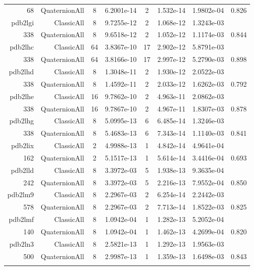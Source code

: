 \begin{xltabular}{\textwidth}{r|rcS[table-format=1.4e+2]cS[table-format=1.3e+2]S[table-format=1.4e+2]S[table-format=-1.3]}
68 & QuaternionAll & 8 & 6.2001e-14 & 2 & 1.532e-14 & 1.9802e-04 & 0.826\\  \addlinespace
pdb2lgi & ClassicAll & 8 & 9.7255e-12 & 2 & 1.068e-12 & 1.3243e-03 & \\
338 & QuaternionAll & 8 & 9.6518e-12 & 2 & 1.052e-12 & 1.1174e-03 & 0.844\\  \addlinespace
pdb2lhc & ClassicAll & 64 & 3.8367e-10 & 17 & 2.902e-12 & 5.8791e-03 & \\
338 & QuaternionAll & 64 & 3.8166e-10 & 17 & 2.997e-12 & 5.2790e-03 & 0.898\\  \addlinespace
pdb2lhd & ClassicAll & 8 & 1.3048e-11 & 2 & 1.930e-12 & 2.0522e-03 & \\
338 & QuaternionAll & 8 & 1.4592e-11 & 2 & 2.033e-12 & 1.6262e-03 & 0.792\\  \addlinespace
pdb2lhe & ClassicAll & 16 & 9.7862e-10 & 2 & 4.963e-11 & 2.0862e-03 & \\
338 & QuaternionAll & 16 & 9.7867e-10 & 2 & 4.967e-11 & 1.8307e-03 & 0.878\\  \addlinespace
pdb2lhg & ClassicAll & 8 & 5.0995e-13 & 6 & 6.485e-14 & 1.3246e-03 & \\
338 & QuaternionAll & 8 & 5.4683e-13 & 6 & 7.343e-14 & 1.1140e-03 & 0.841\\  \addlinespace
pdb2lix & ClassicAll & 2 & 4.9988e-13 & 1 & 4.842e-14 & 4.9641e-04 & \\
162 & QuaternionAll & 2 & 5.1517e-13 & 1 & 5.614e-14 & 3.4416e-04 & 0.693\\  \addlinespace
pdb2lld & ClassicAll & 8 & 3.3972e-03 & 5 & 1.938e-13 & 9.3635e-04 & \\
242 & QuaternionAll & 8 & 3.3972e-03 & 5 & 2.216e-13 & 7.9552e-04 & 0.850\\  \addlinespace
pdb2lm9 & ClassicAll & 8 & 2.2967e-03 & 2 & 6.254e-14 & 2.2442e-03 & \\
578 & QuaternionAll & 8 & 2.2967e-03 & 2 & 7.713e-14 & 1.8522e-03 & 0.825\\  \addlinespace
pdb2lmf & ClassicAll & 8 & 1.0942e-04 & 1 & 1.282e-13 & 5.2052e-04 & \\
140 & QuaternionAll & 8 & 1.0942e-04 & 1 & 1.462e-13 & 4.2699e-04 & 0.820\\  \addlinespace
pdb2ln3 & ClassicAll & 8 & 2.5821e-13 & 1 & 1.292e-13 & 1.9563e-03 & \\
500 & QuaternionAll & 8 & 2.9987e-13 & 1 & 1.359e-13 & 1.6498e-03 & 0.843\\  \addlinespace

\end{xltabular}
